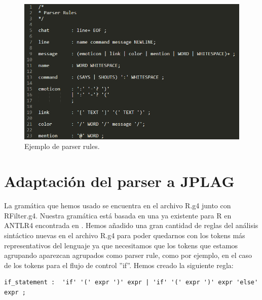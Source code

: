 \begin{figure}[] %
\centering
\includegraphics[scale=0.55]{imagenes/parser_rules.png}  %
\caption{Ejemplo de parser rules.} \label{fig:parser_rules}
\end{figure}


\section{Adaptación del parser a JPLAG}

La gramática que hemos usado se encuentra en el archivo R.g4 junto con RFilter.g4.
Nuestra gramática está basada en una ya existente para R en ANTLR4 encontrada en \cite{repositorio_gramatica}. Hemos añadido una gran cantidad de reglas del análisis sintáctico nuevas en el archivo R.g4 para poder quedarnos con los tokens más representativos del lenguaje ya que necesitamos que los tokens que estamos agrupando aparezcan agrupados como parser rule, como por ejemplo, en el caso de los tokens para el flujo de control ''if''. Hemos creado la siguiente regla:

\begin{center}
\begin{lstlisting}
if_statement :  'if' '(' expr ')' expr | 'if' '(' expr ')' expr 'else' expr ;
\end{lstlisting}
\end{center}

